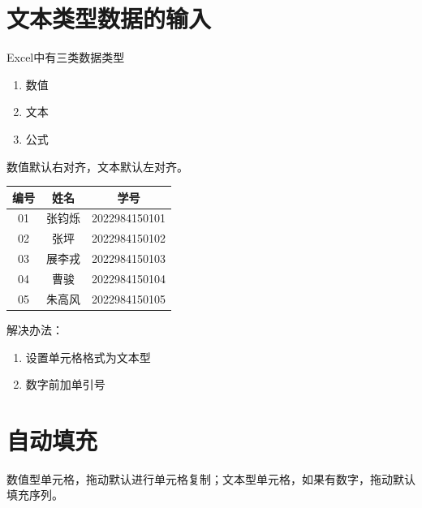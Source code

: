 \section{文本类型数据的输入}

Excel中有三类数据类型
\begin{enumerate}
    \item 数值
    \item 文本
    \item 公式
\end{enumerate}

数值默认右对齐，文本默认左对齐。

\begin{table}[ht]
    \centering
    \begin{tabular}{|c|c|c|}
    \hline
    编号 & 姓名 & 学号 \\ \hline
    01 & 张钧烁 & 2022984150101 \\ \hline
    02 & 张坪 & 2022984150102 \\ \hline
    03 & 展李戎 & 2022984150103 \\ \hline
    04 & 曹骏 & 2022984150104 \\ \hline
    05 & 朱高风 & 2022984150105 \\ \hline
    \end{tabular}
    \end{table}



    解决办法：
    \begin{enumerate}
        \item 设置单元格格式为文本型
        \item 数字前加单引号
    \end{enumerate}

\section{自动填充}

数值型单元格，拖动默认进行单元格复制；文本型单元格，如果有数字，拖动默认填充序列。


